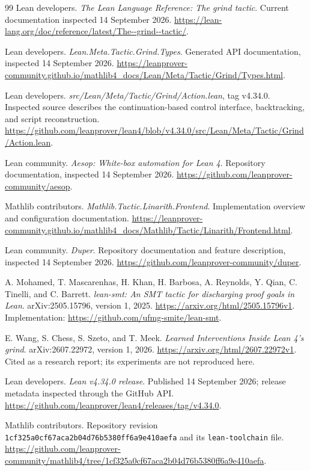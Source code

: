\begin{thebibliography}{99}
\small
{}
Lean developers. \emph{The Lean Language Reference: The grind tactic}.
Current documentation inspected 14 September 2026.
\url{https://lean-lang.org/doc/reference/latest/The--grind--tactic/}.

Lean developers. \emph{Lean.Meta.Tactic.Grind.Types}. Generated API
documentation, inspected 14 September 2026.
\url{https://leanprover-community.github.io/mathlib4_docs/Lean/Meta/Tactic/Grind/Types.html}.

Lean developers. \emph{src/Lean/Meta/Tactic/Grind/Action.lean}, tag v4.34.0.
Inspected source describes the continuation-based control interface,
backtracking, and script reconstruction.
\url{https://github.com/leanprover/lean4/blob/v4.34.0/src/Lean/Meta/Tactic/Grind/Action.lean}.

Lean community. \emph{Aesop: White-box automation for Lean 4}.
Repository documentation, inspected 14 September 2026.
\url{https://github.com/leanprover-community/aesop}.

Mathlib contributors. \emph{Mathlib.Tactic.Linarith.Frontend}.
Implementation overview and configuration documentation.
\url{https://leanprover-community.github.io/mathlib4_docs/Mathlib/Tactic/Linarith/Frontend.html}.

Lean community. \emph{Duper}. Repository documentation and feature description,
inspected 14 September 2026.
\url{https://github.com/leanprover-community/duper}.

A. Mohamed, T. Mascarenhas, H. Khan, H. Barbosa, A. Reynolds, Y. Qian,
C. Tinelli, and C. Barrett.
\emph{lean-smt: An SMT tactic for discharging proof goals in Lean}.
arXiv:2505.15796, version 1, 2025.
\url{https://arxiv.org/html/2505.15796v1}.
Implementation: \url{https://github.com/ufmg-smite/lean-smt}.

E. Wang, S. Chess, S. Szeto, and T. Meek.
\emph{Learned Interventions Inside Lean 4's grind}.
arXiv:2607.22972, version 1, 2026.
\url{https://arxiv.org/html/2607.22972v1}.
Cited as a research report; its experiments are not reproduced here.

Lean developers. \emph{Lean v4.34.0 release}.
Published 14 September 2026; release metadata inspected through the GitHub API.
\url{https://github.com/leanprover/lean4/releases/tag/v4.34.0}.

Mathlib contributors. Repository revision
\texttt{1cf325a0cf67aca2b04d76b5380ff6a9e410aefa} and its
\texttt{lean-toolchain} file.
\url{https://github.com/leanprover-community/mathlib4/tree/1cf325a0cf67aca2b04d76b5380ff6a9e410aefa}.


\end{thebibliography}
